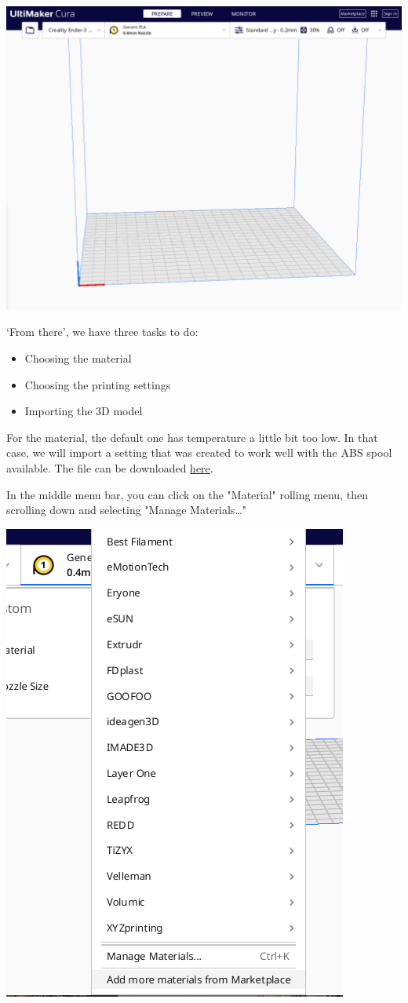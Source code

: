 \documentclass[a4paper,11pt]{article}
\begin{document}
\begin{center}
\includegraphics[width=.95\linewidth]{img/cura/3.png}
\end{center}

`From there', we have three tasks to do:
\begin{itemize}
\item Choosing the material
\item Choosing the printing settings
\item Importing the 3D model
\end{itemize}


For the material, the default one has temperature a little bit too low.
In that case, we will import a setting that was created to work well with the
ABS spool available.
The file can be downloaded \href{https://gitlab.com/sunoc/Marlin/-/snippets/2540628}{here}.

In the middle menu bar, you can click on the "Material" rolling menu, then scrolling down
and selecting "Manage Materials\ldots{}"

\begin{center}
\includegraphics[width=.7\linewidth]{img/cura/4.png}
\end{center}
\end{document}
